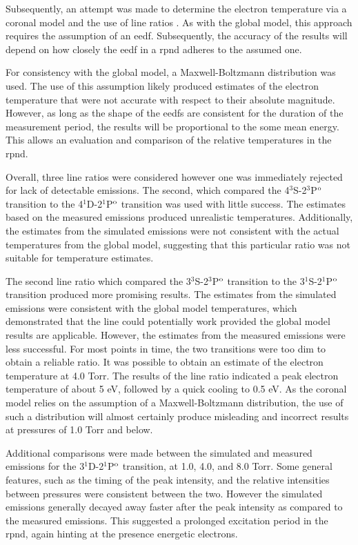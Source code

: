 Subsequently, an attempt was made to determine the electron temperature via a
coronal model and the use of line ratios \cite{Griem2005}. As with the global
model, this approach requires the assumption of an \acs{eedf}. Subsequently, the
accuracy of the results will depend on how closely the \acs{eedf} in a
\acs{rpnd} adheres to the assumed one.

For consistency with the global model, a Maxwell-Boltzmann distribution was
used. The use of this assumption likely produced estimates of the electron
temperature that were not accurate with respect to their absolute magnitude.
However, as long as the shape of the \acs{eedf}s are consistent for the duration
of the measurement period, the results will be proportional to the some mean
energy. This allows an evaluation and comparison of the relative temperatures in
the \acs{rpnd}.

Overall, three line ratios were considered however one was immediately rejected
for lack of detectable emissions. The second, which compared the
4$^3$S-2$^3$P$^\mathrm{o}$ transition to the 4$^1$D-2$^1$P$^\mathrm{o}$ transition was used
with little success. The estimates based on the measured emissions produced
unrealistic temperatures. Additionally, the estimates from the simulated
emissions were not consistent with the actual temperatures from the global
model, suggesting that this particular ratio was not suitable for temperature
estimates.

The second line ratio which compared the 3$^3$S-2$^3$P$^\mathrm{o}$ transition to the
3$^1$S-2$^1$P$^\mathrm{o}$ transition produced more promising results. The estimates
from the simulated emissions were consistent with the global model temperatures,
which demonstrated that the line could potentially work provided the global
model results are applicable. However, the estimates from the measured emissions
were less successful. For most points in time, the two transitions were too dim
to obtain a reliable ratio. It was possible to obtain an estimate of the
electron temperature at 4.0 Torr. The results of the line ratio indicated a peak
electron temperature of about 5 eV, followed by a quick cooling to 0.5 eV. As
the coronal model relies on the assumption of a Maxwell-Boltzmann distribution,
the use of such a distribution will almost certainly produce misleading and
incorrect results at pressures of 1.0 Torr and below.

Additional comparisons were made between the simulated and measured emissions
for the 3$^1$D-2$^1$P$^\mathrm{o}$ transition, at 1.0, 4.0, and 8.0 Torr. Some general
features, such as the timing of the peak intensity, and the relative intensities
between pressures were consistent between the two. However the simulated
emissions generally decayed away faster after the peak intensity as compared to
the measured emissions. This suggested a prolonged excitation period in the
\acs{rpnd}, again hinting at the presence energetic electrons.

